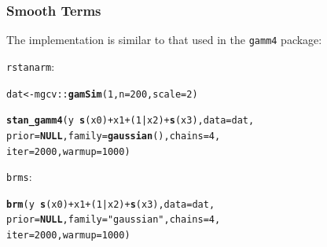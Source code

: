 \documentclass[handout]{beamer}\usepackage[]{graphicx}\usepackage[]{color}
\makeatletter
\newcommand{\hlnum}[1]{\textcolor[rgb]{0.686,0.059,0.569}{#1}}%
\newcommand{\hlstr}[1]{\textcolor[rgb]{0.192,0.494,0.8}{#1}}%
\newcommand{\hlopt}[1]{\textcolor[rgb]{0,0,0}{#1}}%
\newcommand{\hlstd}[1]{\textcolor[rgb]{0.345,0.345,0.345}{#1}}%
\newcommand{\hlkwa}[1]{\textcolor[rgb]{0.161,0.373,0.58}{\textbf{#1}}}%
\newcommand{\hlkwb}[1]{\textcolor[rgb]{0.69,0.353,0.396}{#1}}%
\newcommand{\hlkwc}[1]{\textcolor[rgb]{0.333,0.667,0.333}{#1}}%
\newcommand{\hlkwd}[1]{\textcolor[rgb]{0.737,0.353,0.396}{\textbf{#1}}}%
\newenvironment{kframe}{%
 \def\at@end@of@kframe{}%
 \ifinner\ifhmode%
  \def\at@end@of@kframe{\end{minipage}}%
  \begin{minipage}{\columnwidth}%
 \fi\fi%
 \def\FrameCommand##1{\hskip\@totalleftmargin \hskip-\fboxsep
 \colorbox{shadecolor}{##1}\hskip-\fboxsep
     \hskip-\linewidth \hskip-\@totalleftmargin \hskip\columnwidth}%
 \MakeFramed {\advance\hsize-\width
   \@totalleftmargin\z@ \linewidth\hsize
   \@setminipage}}%
 {\par\unskip\endMakeFramed%
 \at@end@of@kframe}
\newenvironment{knitrout}{}{} %
\makeatother
\begin{document}
\begin{frame}[fragile]
\frametitle{Smooth Terms}
The implementation is
similar to that used in the \texttt{gamm4} package:

\texttt{rstanarm}: 

\begin{knitrout}
\color{fgcolor}\begin{kframe}
\begin{alltt}
\hlstd{dat} \hlkwb{<-} \hlstd{mgcv}\hlopt{::}\hlkwd{gamSim}\hlstd{(}\hlnum{1}\hlstd{,} \hlkwc{n} \hlstd{=} \hlnum{200}\hlstd{,} \hlkwc{scale} \hlstd{=} \hlnum{2}\hlstd{)}

\hlkwd{stan_gamm4}\hlstd{(y} \hlopt{~} \hlkwd{s}\hlstd{(x0)} \hlopt{+} \hlstd{x1} \hlopt{+} \hlstd{(}\hlnum{1}\hlopt{|}\hlstd{x2)} \hlopt{+} \hlkwd{s}\hlstd{(x3),} \hlkwc{data} \hlstd{= dat,}
                 \hlkwc{prior} \hlstd{=} \hlkwa{NULL}\hlstd{,} \hlkwc{family} \hlstd{=} \hlkwd{gaussian}\hlstd{(),} \hlkwc{chains}\hlstd{=}\hlnum{4}\hlstd{,}
                 \hlkwc{iter}\hlstd{=}\hlnum{2000}\hlstd{,} \hlkwc{warmup}\hlstd{=}\hlnum{1000}\hlstd{)}
\end{alltt}
\end{kframe}
\end{knitrout}

\texttt{brms}: 

\begin{knitrout}
\color{fgcolor}\begin{kframe}
\begin{alltt}
\hlkwd{brm}\hlstd{(y} \hlopt{~} \hlkwd{s}\hlstd{(x0)} \hlopt{+} \hlstd{x1} \hlopt{+} \hlstd{(}\hlnum{1}\hlopt{|}\hlstd{x2)} \hlopt{+} \hlkwd{s}\hlstd{(x3),} \hlkwc{data} \hlstd{= dat,}
    \hlkwc{prior} \hlstd{=} \hlkwa{NULL}\hlstd{,} \hlkwc{family}\hlstd{=}\hlstr{"gaussian"}\hlstd{,} \hlkwc{chains}\hlstd{=}\hlnum{4}\hlstd{,}
    \hlkwc{iter}\hlstd{=}\hlnum{2000}\hlstd{,} \hlkwc{warmup}\hlstd{=}\hlnum{1000}\hlstd{)}
\end{alltt}
\end{kframe}
\end{knitrout}

\end{frame}

\end{document}
